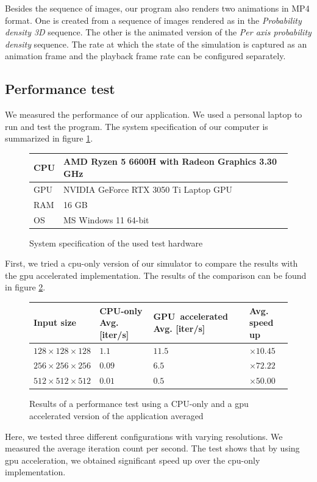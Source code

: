 Besides the sequence of images, our program also renders two animations in MP4 format.
One is created from a sequence of images rendered as in the \textit{Probability density 3D} sequence.
The other is the animated version of the \textit{Per axis probability density} sequence.
The rate at which the state of the simulation is captured as an animation frame and the playback frame rate can be configured separately.

\subsection{Performance test}

We measured the performance of our application.
We used a personal laptop to run and test the program.
The system specification of our computer is summarized in figure \ref{fig:system_spec}.
\begin{figure}
	\begin{center}
		\begin{tabular}{|m{5em}||m{25em}|}
			\hline
			CPU & AMD Ryzen 5 6600H with Radeon Graphics            3.30 GHz\\
			\hline
			GPU & NVIDIA GeForce RTX 3050 Ti Laptop GPU\\		
			\hline
			RAM & 16 GB\\		
			\hline
			OS & MS Windows 11 64-bit\\		
			\hline
		\end{tabular}
		\caption{System specification of the used test hardware}
		\label{fig:system_spec}
	\end{center}
\end{figure}
First, we tried a \acrshort{cpu}-only version of our simulator to compare the results with the \acrshort{gpu} accelerated implementation.
The results of the comparison can be found in figure \ref{fig:performance_test}.
\begin{figure}
	\begin{center}
		\begin{tabular}{|m{8em}||m{8em}| m{8em}| m{4em}|}
			\hline
			Input size & CPU-only Avg. [iter/s] & GPU~accelerated Avg. [iter/s] & Avg. speed up\\
			\hline
			$128 \times 128 \times 128$ & $1.1$ & $11.5$ & $\times 10.45$\\
			\hline
			$256 \times 256 \times 256$ & $0.09$ & $6.5$ & $\times 72.22$\\
			\hline
			$512 \times 512 \times 512$ & $0.01$ & $0.5$ & $\times 50.00$\\
			\hline
		\end{tabular}
		\caption{Results of a performance test using a CPU-only and a \acrshort{gpu} accelerated version of the application averaged}
		\label{fig:performance_test}
	\end{center}
\end{figure}
Here, we tested three different configurations with varying resolutions.
We measured the average iteration count per second.
The test shows that by using \acrshort{gpu} acceleration, we obtained significant speed up over the \acrshort{cpu}-only implementation.






